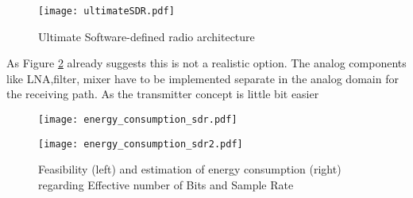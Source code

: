 \begin{figure}[ht]
	\centering
  \texttt{[image: ultimateSDR.pdf]}
	\caption{Ultimate Software-defined radio architecture \cite{DevalRivetVeyracEtAl2013}}
	\label{fig:ultimateSDR}
\end{figure}

As Figure \ref{fig:feas_energy} already suggests this is not a realistic option.
The analog components like LNA,filter, mixer have to be implemented separate in the analog domain for the receiving path.
As the transmitter concept is little bit easier

\begin{figure}[htbp]
	\begin{minipage}{0.49\linewidth} 
	\texttt{[image: energy\_consumption\_sdr.pdf]}
	\end{minipage}
	\hfill
	\begin{minipage}{0.49\linewidth}
	\texttt{[image: energy\_consumption\_sdr2.pdf]}
	\end{minipage}
 \caption{Feasibility (left) and estimation of energy consumption (right) regarding Effective number of Bits and Sample Rate \cite{RivetDevalJ.-B.EtAl2010}}
 \label{fig:feas_energy}
\end{figure}



